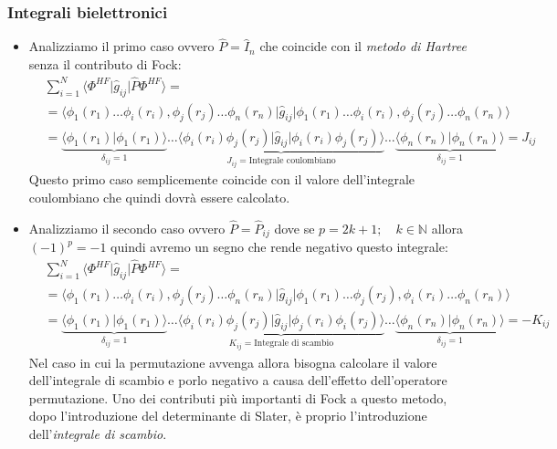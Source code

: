 \documentclass[oneside]{amsbook}
\numberwithin{section}{chapter}
\numberwithin{equation}{section}
\numberwithin{figure}{section}
\begin{document}
\subsubsection{Integrali bielettronici}
\begin{itemize}
\item Analizziamo il primo caso ovvero $\hat{P}=\hat{I}_n $ che coincide con il \emph{metodo di Hartree} senza il contributo di Fock:
\begin{equation}
\begin{aligned}
&\sum \limits_{i=1} ^{N}  \langle \Phi^{HF}\vert\hat{g}_{ij}\vert\hat{P}\Phi^{HF}\rangle = \\
&= \langle\phi_1(r_1)\ldots\phi_i(r_i),\phi_j(r_j)\ldots \phi_n(r_n)\vert\hat{g}_{ij}\vert\phi_1(r_1)\ldots\phi_i(r_i),\phi_j(r_j)\ldots \phi_n(r_n)\rangle \\
&= \underbrace{\langle\phi_1(r_1)\vert\phi_1(r_1)\rangle}_{\delta_{ij}=1} \ldots \underbrace{\langle\phi_i(r_i)\phi_j(r_j)\vert\hat{g}_{ij}\vert\phi_i(r_i)\phi_j(r_j)\rangle}_{J_{ij}= \text{Integrale coulombiano}} \ldots \underbrace{\langle\phi_n(r_n)\vert\phi_n(r_n)\rangle}_{\delta_{ij}=1} = J_{ij}
\end{aligned}
\end{equation}
Questo primo caso semplicemente coincide con il valore dell'integrale coulombiano che quindi dovrà essere calcolato.
\item Analizziamo il secondo caso ovvero $\hat{P}=\hat{P}_{ij} $ dove se $p=2k+1;\quad k\in \mathbb{N}$ allora $(-1)^p=-1$ quindi avremo un segno che rende negativo questo integrale:
\begin{equation}
\begin{aligned}
&\sum \limits_{i=1} ^{N}  \langle \Phi^{HF}\vert\hat{g}_{ij}\vert\hat{P}\Phi^{HF}\rangle = \\
&= \langle\phi_1(r_1)\ldots\phi_i(r_i),\phi_j(r_j)\ldots \phi_n(r_n)\vert\hat{g}_{ij}\vert\phi_1(r_1)\ldots\phi_j(r_j),\phi_i(r_i)\ldots \phi_n(r_n)\rangle \\
&= \underbrace{\langle\phi_1(r_1)\vert\phi_1(r_1)\rangle}_{\delta_{ij}=1} \ldots \underbrace{\langle\phi_i(r_i)\phi_j(r_j)\vert\hat{g}_{ij}\vert\phi_j(r_i)\phi_i(r_j)\rangle}_{K_{ij}= \text{Integrale di scambio}} \ldots \underbrace{\langle\phi_n(r_n)\vert\phi_n(r_n)\rangle}_{\delta_{ij}=1} = -K_{ij}
\end{aligned}
\end{equation}
Nel caso in cui la permutazione avvenga allora bisogna calcolare il valore dell'integrale di scambio e porlo negativo a causa dell'effetto dell'operatore permutazione. Uno dei contributi più importanti di Fock a questo metodo, dopo l'introduzione del determinante di Slater, è proprio l'introduzione dell'\emph{integrale di scambio}.
\end{itemize}
\end{document}
